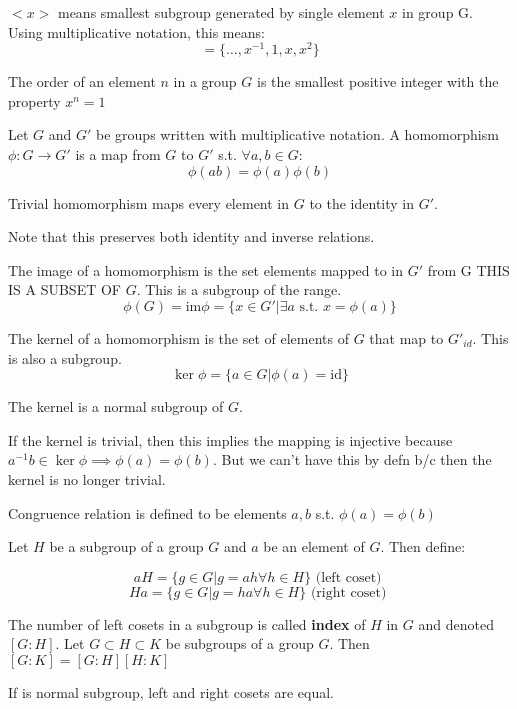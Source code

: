 \begin{definition}
  $<x>$ means smallest subgroup generated by single element $x$ in group G.
  Using multiplicative notation, this means:
  \[< x > = \{\ldots, x^{-1}, 1, x, x^{2}\}\]
\end{definition}

\begin{definition}
  The order of an element $n$ in a group $G$ is the smallest positive integer
  with the property $x^{n}=1$
\end{definition}

\begin{definition}
  Let $G$ and $G'$ be groups written with multiplicative notation. A
  homomorphism $\phi:G\rightarrow G'$ is a map from $G$ to $G'$ s.t. $\forall a,b\in G$:
  \[\phi (ab)=\phi (a) \phi (b)\]

  Trivial homomorphism maps every element in $G$ to the identity in $G'$.

  Note that this preserves both identity and inverse relations.

  The image of a homomorphism is the set elements mapped to in $G'$ from G
  THIS IS A SUBSET OF $G$. This is a subgroup of the range.
  \[\phi ( G ) = \text{im} \phi = \{x \in G' | \exists a \text{ s.t. }x = \phi (a)\}\]

  The kernel of a homomorphism is the set of elements of $G$ that map to
  $G'_{id}$. This is also a subgroup.
  \[\ker \phi = \{a \in G | \phi(a) = \text{id}\}\]

  The kernel is a normal subgroup of $G$.

  If the kernel is trivial, then this implies the mapping is injective because
  $a^{-1}b \in \ker\phi\implies \phi (a)=\phi (b)$. But we can't have this by
  defn b/c then the kernel is no longer trivial.

  Congruence relation is defined to be elements $a,b$ s.t. $\phi(a) = \phi(b)$

\end{definition}

\begin{definition}
  Let $H$ be a subgroup of a group $G$ and $a$ be an element of $G$. Then define:

  \[aH = \{g \in G | g = ah \forall h \in H\} \text{ (left coset) }\]
  \[Ha = \{g \in G | g = ha \forall h \in H\} \text{ (right coset) }\]

  The number of left cosets in a subgroup is called \textbf{index} of $H$ in $G$
  and denoted $[G:H]$. Let $G \subset H \subset K$ be subgroups of a group $G$.
  Then $[G:K] = [G:H][H:K]$

  If is normal subgroup, left and right cosets are equal.
\end{definition}

